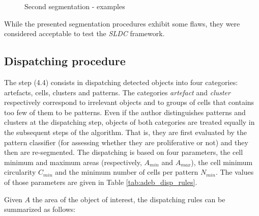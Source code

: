 \begin{figure}
	\center
	\caption{Second segmentation - examples}
	\label{fig:second_seg_examples}
\end{figure}

While the presented segmentation procedures exhibit some flaws, they were considered acceptable to test the \textit{SLDC} framework.

\subsection{Dispatching procedure}

The step (4.4) consists in dispatching detected objects into four categories: artefacts, cells, clusters and patterns. The categories \textit{artefact} and \textit{cluster} respectively correspond to irrelevant objects and to groups of cells that contains too few of them to be patterns. Even if the author distinguishes patterns and clusters at the dispatching step, objects of both categories are treated equally in the subsequent steps of the algorithm. That is, they are first evaluated by the pattern classifier (for assessing whether they are proliferative or not) and they then are re-segmented. The dispatching is based on four parameters, the cell minimum and maximum areas (respectively, $A_{min}$ and $A_{max}$), the cell minimum circularity $C_{min}$ and the minimum number of cells per pattern $N_{min}$. The values of those parameters are given in Table \ref{tab:adeb_disp_rules}. 

Given $A$ the area of the object of interest, the dispatching rules can be summarized as follows:


